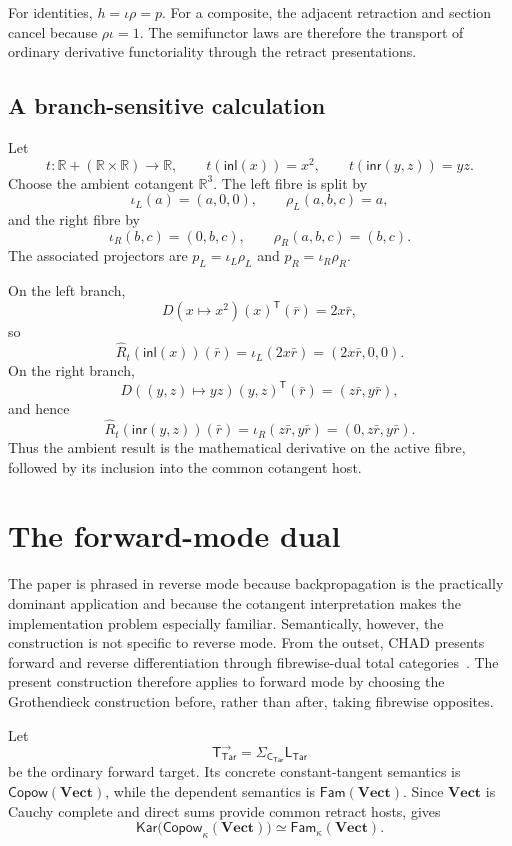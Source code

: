 \documentclass[runningheads,envcountsame]{llncs}
\newcommand{\Vect}{\mathbf{Vect}}
\newcommand{\Tar}{\mathsf{Tar}}
\newcommand{\CTar}{\mathsf C_{\Tar}}
\newcommand{\LTar}{\mathsf L_{\Tar}}
\newcommand{\Copow}{\mathsf{Copow}}
\newcommand{\Fam}{\mathsf{Fam}}
\newcommand{\Kar}{\mathsf{Kar}}
\newcommand{\TotTarFwd}{\mathsf T_{\Tar}^{\rightarrow}}
\begin{document}
For identities, $h=\iota\rho=p$. For a composite, the adjacent retraction and
section cancel because $\rho\iota=1$. The semifunctor laws are therefore the
transport of ordinary derivative functoriality through the retract
presentations.

\subsection{A branch-sensitive calculation}

Let
$$
t:\mathbb R+(\mathbb R\times\mathbb R)\to\mathbb R,
\qquad
t(\mathsf{inl}(x))=x^2,
\qquad
t(\mathsf{inr}(y,z))=yz.
$$
Choose the ambient cotangent $\mathbb R^3$. The left fibre is split by
$$
\iota_L(a)=(a,0,0),
\qquad
\rho_L(a,b,c)=a,
$$
and the right fibre by
$$
\iota_R(b,c)=(0,b,c),
\qquad
\rho_R(a,b,c)=(b,c).
$$
The associated projectors are $p_L=\iota_L\rho_L$ and
$p_R=\iota_R\rho_R$.

On the left branch,
$$
D(x\mapsto x^2)(x)^{\mathsf T}(\bar r)=2x\bar r,
$$
so
$$
\widehat R_t(\mathsf{inl}(x))(\bar r)
=
\iota_L(2x\bar r)
=(2x\bar r,0,0).
$$
On the right branch,
$$
D((y,z)\mapsto yz)(y,z)^{\mathsf T}(\bar r)
=(z\bar r,y\bar r),
$$
and hence
$$
\widehat R_t(\mathsf{inr}(y,z))(\bar r)
=
\iota_R(z\bar r,y\bar r)
=(0,z\bar r,y\bar r).
$$
Thus the ambient result is the mathematical derivative on the active fibre,
followed by its inclusion into the common cotangent host.

\section{The forward-mode dual}
\label{app:forward}

The paper is phrased in reverse mode because backpropagation is the practically dominant application and because the cotangent interpretation makes the implementation problem especially familiar. Semantically, however, the construction is not specific to reverse mode. From the outset, CHAD presents forward and reverse differentiation through fibrewise-dual total categories~\cite{Vakar2021,VakarSmeding2022,LucatelliNunesVakar2023}. The present construction therefore applies to forward mode by choosing the Grothendieck construction before, rather than after, taking fibrewise opposites.

Let
$$
\TotTarFwd=\Sigma_{\CTar}\LTar
$$
be the ordinary forward target. Its concrete constant-tangent semantics is $\Copow(\Vect)$, while the dependent semantics is $\Fam(\Vect)$. Since $\Vect$ is Cauchy complete and direct sums provide common retract hosts,  gives
$$
\Kar\bigl(\Copow_\kappa(\Vect)\bigr)
\simeq
\Fam_\kappa(\Vect).
$$
\end{document}
